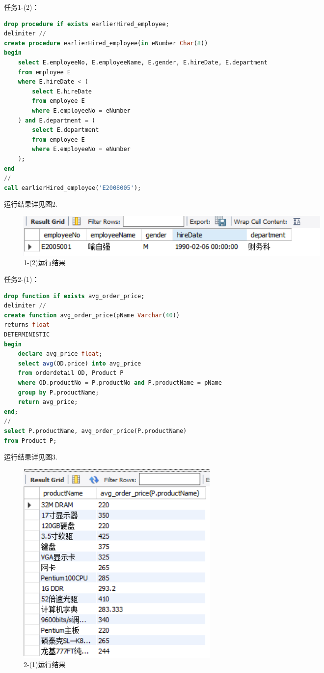 \documentclass[a4paper,UTF8]{article}
\theoremstyle{definition}
\begin{document}
\begin{CJK}{UTF8}{gkai}
{\heiti \large 任务1-(2)：}
\begin{lstlisting}[language=SQL]
drop procedure if exists earlierHired_employee;
delimiter //
create procedure earlierHired_employee(in eNumber Char(8))
begin
	select E.employeeNo, E.employeeName, E.gender, E.hireDate, E.department
    from employee E
    where E.hireDate < (
		select E.hireDate
        from employee E
        where E.employeeNo = eNumber
    ) and E.department = (
		select E.department
        from employee E
        where E.employeeNo = eNumber
    );
end
//
call earlierHired_employee('E2008005');
\end{lstlisting}
\par 运行结果详见图2.
\begin{figure}[h]
\centering
\includegraphics[scale=0.6]{./img/1-2.png}
\caption{1-(2)运行结果}
\label{fig:label}
\end{figure}

{\heiti \large 任务2-(1)：}
\begin{lstlisting}[language=SQL]
drop function if exists avg_order_price;
delimiter //
create function avg_order_price(pName Varchar(40))
returns float
DETERMINISTIC
begin
	declare avg_price float;
	select avg(OD.price) into avg_price
    from orderdetail OD, Product P
    where OD.productNo = P.productNo and P.productName = pName
    group by P.productName;
    return avg_price;
end;
//
select P.productName, avg_order_price(P.productName)
from Product P;
\end{lstlisting}
\par 运行结果详见图3.
\begin{figure}[h]
\centering
\includegraphics[scale=0.6]{./img/2-1.png}
\caption{2-(1)运行结果}
\label{fig:label}
\end{figure}


\end{CJK}
\end{document}
